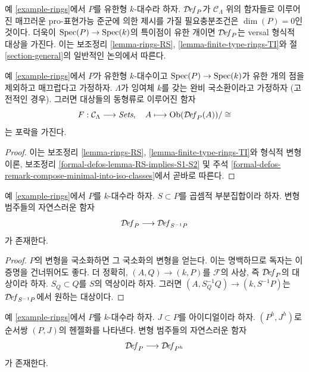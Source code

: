 \noindent
예 \ref{example-rings}에서 $P$를 유한형 $k$-대수라 하자.
$\mathcal{D}\!\mathit{ef}_P$가 $\mathcal{C}_\Lambda$ 위의 함자들로 이루어진
매끄러운 pro-표현가능 준군에 의한 제시를 가질 필요충분조건은
$\dim(P) = 0$인 것이다. 더욱이 $\mathop{\mathrm{Spec}}(P) \to \mathop{\mathrm{Spec}}(k)$의 특이점이
유한 개이면 $\mathcal{D}\!\mathit{ef}_P$는 versal 형식적 대상을 가진다.
이는 보조정리 \ref{lemma-rings-RS}, \ref{lemma-finite-type-rings-TI}와
절 \ref{section-general}의 일반적인 논의에서 따른다.

\begin{lemma}
\label{lemma-rings-hull}
예 \ref{example-rings}에서 $P$가 유한형 $k$-대수이고
$\mathop{\mathrm{Spec}}(P) \to \mathop{\mathrm{Spec}}(k)$가 유한 개의 점을 제외하고 매끄럽다고 가정하자.
$\Lambda$가 잉여체 $k$를 갖는 완비 국소환이라고 가정하자
(고전적인 경우). 그러면 대상들의 동형류로 이루어진 함자
$$
F : \mathcal{C}_\Lambda \longrightarrow \textit{Sets},\quad
A \longmapsto \mathop{\mathrm{Ob}}\nolimits(\mathcal{D}\!\mathit{ef}_P(A))/\cong
$$
는 포락을 가진다.
\end{lemma}

\begin{proof}
이는 보조정리 \ref{lemma-rings-RS}, \ref{lemma-finite-type-rings-TI}와
형식적 변형 이론, 보조정리
\ref{formal-defos-lemma-RS-implies-S1-S2} 및 주석
\ref{formal-defos-remark-compose-minimal-into-iso-classes}에서 곧바로 따른다.
\end{proof}

\begin{lemma}
\label{lemma-localization}
예 \ref{example-rings}에서 $P$를 $k$-대수라 하자.
$S \subset P$를 곱셈적 부분집합이라 하자. 변형 범주들의 자연스러운 함자
$$
\mathcal{D}\!\mathit{ef}_P \longrightarrow \mathcal{D}\!\mathit{ef}_{S^{-1}P}
$$
가 존재한다.
\end{lemma}

\begin{proof}
$P$의 변형을 국소화하면 그 국소화의 변형을 얻는다. 이는 명백하므로
독자는 이 증명을 건너뛰어도 좋다. 더 정확히, $(A, Q) \to (k, P)$를
$\mathcal{F}$의 사상, 즉 $\mathcal{D}\!\mathit{ef}_P$의 대상이라 하자.
$S_Q \subset Q$를 $S$의 역상이라 하자. 그러면%
$(A, S_Q^{-1}Q) \to (k, S^{-1}P)$는
$\mathcal{D}\!\mathit{ef}_{S^{-1}P}$에서 원하는 대상이다.
\end{proof}

\begin{lemma}
\label{lemma-henselization}
예 \ref{example-rings}에서 $P$를 $k$-대수라 하자.
$J \subset P$를 아이디얼이라 하자. $(P^h, J^h)$로 순서쌍 $(P, J)$의
헨젤화를 나타낸다. 변형 범주들의 자연스러운 함자
$$
\mathcal{D}\!\mathit{ef}_P \longrightarrow \mathcal{D}\!\mathit{ef}_{P^h}
$$
가 존재한다.
\end{lemma}

